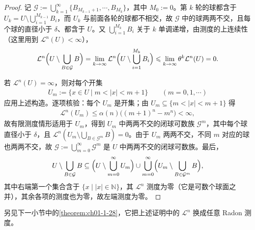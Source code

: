 \documentclass[../../main.tex]{subfiles}%
\begin{document}
\begin{proof}
记 $\mathcal{G}:=\bigcup_{k=1}^{\infty}\{B_{M_{k-1}+1},\cdots,B_{M_k}\}$，其中 $M_0:=0$。第 $k$ 轮的球都含于 $U_k=U\setminus\bigcup_{i=1}^{M_{k-1}}B_i$，而 $U_k$ 与前面各轮的球都不相交，故 $\mathcal{G}$ 中的球两两不交，且每个球的直径小于 $\delta$、都含于 $U$。又 $\bigcup_{i=1}^{M_k}B_i$ 关于 $k$ 单调递增，由测度的上连续性（这里用到 $\mathcal{L}^n(U)<\infty$），
\begin{align*}
\mathcal{L}^n\Bigl(U\setminus\bigcup_{B\in\mathcal{G}}B\Bigr)
=\lim_{k\to\infty}\mathcal{L}^n\Bigl(U\setminus\bigcup_{i=1}^{M_k}B_i\Bigr)
\leqslant\lim_{k\to\infty}\theta^k\mathcal{L}^n(U)=0 .
\end{align*}

若 $\mathcal{L}^n(U)=\infty$，则对每个开集
\begin{align*}
U_m:=\{x\in U\mid m<\lvert x\rvert<m+1\}\qquad(m=0,1,\cdots)
\end{align*}
应用上述构造。逐项核验：每个 $U_m$ 是开集；由 $U_m\subseteq\{m<\lvert x\rvert<m+1\}$ 得
\begin{align*}
\mathcal{L}^n(U_m)\leqslant\alpha(n)\bigl((m+1)^n-m^n\bigr)<\infty,
\end{align*}
故有限测度情形适用于 $U_m$，得到 $U_m$ 中两两不交的闭球可数族 $\mathcal{G}^m$，其中每个球直径小于 $\delta$，且 $\mathcal{L}^n(U_m\setminus\bigcup_{B\in\mathcal{G}^m}B)=0$。由于 $U_m$ 两两不交，不同 $m$ 对应的球也两两不交，故 $\mathcal{G}:=\bigcup_{m=0}^{\infty}\mathcal{G}^m$ 是 $U$ 中两两不交的闭球可数族。最后，
\begin{align*}
U\setminus\bigcup_{B\in\mathcal{G}}B
\subseteq\Bigl(U\setminus\bigcup_{m=0}^{\infty}U_m\Bigr)\cup\bigcup_{m=0}^{\infty}\Bigl(U_m\setminus\bigcup_{B\in\mathcal{G}^m}B\Bigr),
\end{align*}
其中右端第一个集合含于 $\{x\mid\lvert x\rvert\in\mathbb{N}\}$，其 $\mathcal{L}^n$ 测度为零（它是可数个球面之并），其余各项的测度也为零，故左端测度为零。
\end{proof}

\begin{remark}\label{remark:ch01-thm-1-26-比较}
另见下一小节中的\cref{theorem:ch01-1-28}，它把上述证明中的 $\mathcal{L}^n$ 换成任意 Radon 测度。%
\end{remark}
\end{document}
